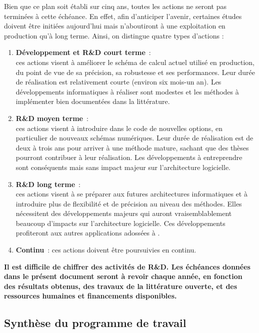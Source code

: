 Bien que ce plan soit \'etabli sur cinq ans, toutes les actions ne seront pas termin\'ees \`a cette \'ech\'eance. En effet, afin d'anticiper l'avenir, certaines \'etudes
doivent \^etre initi\'ees aujourd'hui mais n'aboutiront \`a une exploitation en production qu'\`a long terme. Ainsi, on distingue quatre types d'actions :
\begin{enumerate}
\item
{ \bf{D\'eveloppement et R\&D court terme}}~: \\
ces actions visent \`a am\'eliorer le sch\'ema de calcul actuel utilis\'e en production, du point de vue de sa pr\'ecision, sa robustesse et ses performances. Leur dur\'ee de r\'ealisation est relativement courte (environ six mois-un an). Les d\'eveloppements informatiques \`a r\'ealiser sont modestes et les m\'ethodes \`a impl\'ementer bien document\'ees dans la litt\'erature.
\item
{\bf{R\&D moyen terme}}~: \\
ces actions visent \`a introduire dans le code de nouvelles options, en particulier de nouveaux sch\'emas num\'eriques. Leur dur\'ee de r\'ealisation est de deux \`a trois ans pour arriver \`a une m\'ethode mature, sachant que des th\`eses pourront contribuer \`a leur r\'ealisation. Les d\'eveloppements \`a entreprendre sont cons\'equents mais sans impact majeur sur l'architecture logicielle.
\item
{\bf{R\&D long terme}}~: \\
ces actions visent \`a se pr\'eparer aux futures architectures informatiques et \`a introduire plus de flexibilit\'e et de pr\'ecision au niveau des m\'ethodes. Elles n\'ecessitent des d\'eveloppements majeurs qui auront vraisemblablement beaucoup d'impacts sur l'architecture logicielle. Ces d\'eveloppements profiteront aux autres applications adoss\'ees \`a {}.
\item
{\bf{Continu}}~: ces actions doivent \^etre poursuivies en continu. \\
\end{enumerate}

{\bf{Il est difficile de chiffrer des activit\'es de R\&D. Les \'ech\'eances donn\'ees dans le pr\'esent document seront \`a revoir chaque ann\'ee, en fonction des r\'esultats obtenus, des travaux de la litt\'erature ouverte, et des ressources humaines et financements disponibles. \\ 
}}


\subsection{Synth\`ese du programme de travail}
\label{synthese_programme_travail}


